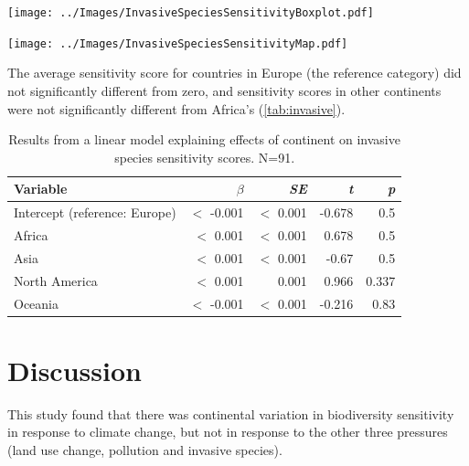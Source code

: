 \documentclass[11pt, a4paper, titlepage]{article}
\begin{document}
	\begin{center}
		
		\texttt{[image: ../Images/InvasiveSpeciesSensitivityBoxplot.pdf]}
		\label{invasivebox}
		
		\texttt{[image: ../Images/InvasiveSpeciesSensitivityMap.pdf]}
		\label{invasivemap}
		

	\end{center}

    The average sensitivity score for countries in Europe (the reference category) did not significantly different from zero, and sensitivity scores in other continents were not significantly different from Africa's (\autoref{tab:invasive}). 
    
    
	\begin{table}[H]
		\begin{center}
			\caption{Results from a linear model explaining effects of continent on invasive species sensitivity scores.\textmd{ N=91.}}
			\label{tab:invasive}
			\begin{tabular}{l|r|r|r|r} %
				Variable & $\beta$ & \textit{SE} & \textit{t} & \textit{p}\\
				\hline
				Intercept (reference: Europe) & $<$ -0.001 & $<$ 0.001 & -0.678 & 0.5\\
				Africa & $<$ 0.001 & $<$ 0.001 & 0.678 & 0.5\\
				Asia & $<$ 0.001 & $<$ 0.001 & -0.67 & 0.5 \\
				North America & $<$ 0.001 & 0.001 & 0.966 & 0.337\\
				Oceania & $<$ -0.001 & $<$ 0.001 & -0.216 & 0.83\\
				
			\end{tabular}
		\end{center}
	\end{table}

    \clearpage
    
     \section*{Discussion}
      This study found that there was continental variation in biodiversity sensitivity in response to climate change, but not in response to the other three pressures (land use change, pollution and invasive species). 
     
\end{document}
